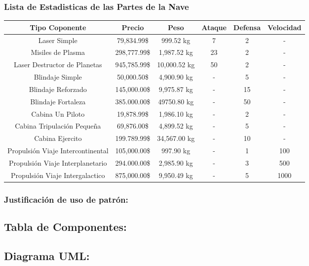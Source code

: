 \documentclass{article}
\begin{document}
\begin{itemize}
\subsubsection{Lista de Estadisticas de las Partes de la Nave}
\begin{table}[]
	\centering
	\begin{tabular}{|c|c|c|c|c|c|}
		\hline
		Tipo Coponente & Precio & Peso & Ataque & Defensa & Velocidad \\ \hline
		Laser Simple & 79,834.99\$ & 999.52 kg & 7 & 2 & - \\
		Misiles de Plasma & 298,777.99\$ & 1,987.52 kg & 23 & 2 & - \\
		Laser Destructor de Planetas & 945,785.99\$ & 10,000.52 kg & 50 & 2 & - \\
		Blindaje Simple & 50,000.50\$ & 4,900.90 kg & - & 5 & - \\
		Blindaje Reforzado & 145,000.00\$ & 9,975.87 kg & - & 15 & - \\
		Blindaje Fortaleza & 385.000.00\$ & 49750.80 kg & - & 50 & - \\
		Cabina Un Piloto & 19,878.99\$ & 1,986.10 kg & - & 2 & - \\
		Cabina Tripulación Pequeña & 69,876.00\$ & 4,899.52 kg & - & 5 & - \\
		Cabina Ejercito & 199.789.99\$ & 34,567.00 kg & - & 10 & - \\
		Propulsión Viaje Intercontinental & 105,000.00\$ & 997.90 kg & - & 1 & 100 \\
		Propulsión Viaje Interplanetario & 294.000.00\$ & 2,985.90 kg & - & 3 & 500 \\
		Propulsión Viaje Intergalactico & 875,000.00\$ & 9,950.49 kg & - & 5 & 1000 \\ \hline
	\end{tabular}
\end{table}
\end{itemize}

\subsubsection*{Justificación de uso de patrón:}


\newpage
\subsection*{Tabla de Componentes:}


\newpage
\subsection*{Diagrama UML:}
\end{document}
